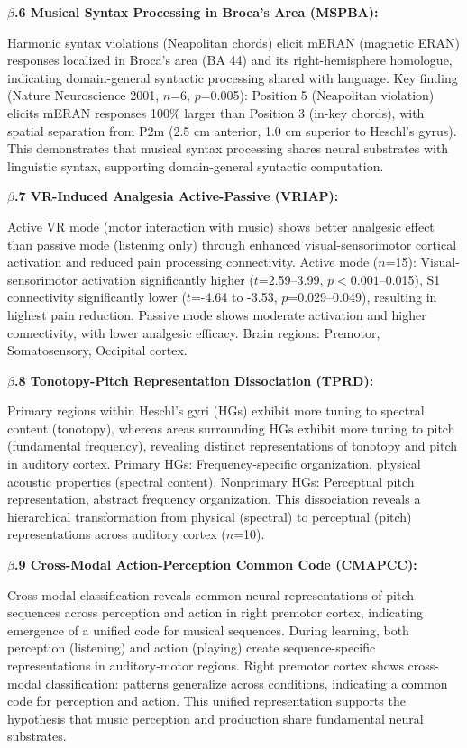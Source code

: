 \documentclass[9pt,onecolumn]{article}
\begin{document}
\textbf{$\beta$.6 Musical Syntax Processing in Broca's Area (MSPBA):}

Harmonic syntax violations (Neapolitan chords) elicit mERAN (magnetic ERAN) responses localized in Broca's area (BA 44) and its right-hemisphere homologue, indicating domain-general syntactic processing shared with language. Key finding (Nature Neuroscience 2001, $n$=6, $p$=0.005): Position 5 (Neapolitan violation) elicits mERAN responses 100\% larger than Position 3 (in-key chords), with spatial separation from P2m (2.5 cm anterior, 1.0 cm superior to Heschl's gyrus). This demonstrates that musical syntax processing shares neural substrates with linguistic syntax, supporting domain-general syntactic computation.

\textbf{$\beta$.7 VR-Induced Analgesia Active-Passive (VRIAP):}

Active VR mode (motor interaction with music) shows better analgesic effect than passive mode (listening only) through enhanced visual-sensorimotor cortical activation and reduced pain processing connectivity. Active mode ($n$=15): Visual-sensorimotor activation significantly higher ($t$=2.59--3.99, $p<0.001$--0.015), S1 connectivity significantly lower ($t$=-4.64 to -3.53, $p$=0.029--0.049), resulting in highest pain reduction. Passive mode shows moderate activation and higher connectivity, with lower analgesic efficacy. Brain regions: Premotor, Somatosensory, Occipital cortex.

\textbf{$\beta$.8 Tonotopy-Pitch Representation Dissociation (TPRD):}

Primary regions within Heschl's gyri (HGs) exhibit more tuning to spectral content (tonotopy), whereas areas surrounding HGs exhibit more tuning to pitch (fundamental frequency), revealing distinct representations of tonotopy and pitch in auditory cortex. Primary HGs: Frequency-specific organization, physical acoustic properties (spectral content). Nonprimary HGs: Perceptual pitch representation, abstract frequency organization. This dissociation reveals a hierarchical transformation from physical (spectral) to perceptual (pitch) representations across auditory cortex ($n$=10).

\textbf{$\beta$.9 Cross-Modal Action-Perception Common Code (CMAPCC):}

Cross-modal classification reveals common neural representations of pitch sequences across perception and action in right premotor cortex, indicating emergence of a unified code for musical sequences. During learning, both perception (listening) and action (playing) create sequence-specific representations in auditory-motor regions. Right premotor cortex shows cross-modal classification: patterns generalize across conditions, indicating a common code for perception and action. This unified representation supports the hypothesis that music perception and production share fundamental neural substrates.
\end{document}
